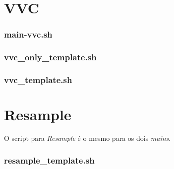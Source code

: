 \section{VVC}
\subsubsection{main-vvc.sh}


\subsubsection{vvc\_only\_template.sh}


\subsubsection{vvc\_template.sh}


\section{Resample}

O script para \textit{Resample} é o mesmo para os dois \textit{mains}.

\subsubsection{resample\_template.sh}
